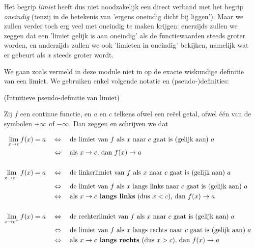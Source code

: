 \documentclass[numbers,wordchoicegiven]{ximera}
\begin{document}
Het begrip \textit{limiet} heeft dus niet noodzakelijk een direct verband met het begrip \textit{oneindig} (tenzij in de betekenis van 'ergens oneindig dicht bij liggen'). Maar we zullen verder toch erg veel met oneindig te maken krijgen: enerzijds zullen we zeggen dat een 'limiet gelijk is aan oneindig' als de functiewaarden steeds groter worden, en anderzijds zullen we ook 'limieten in oneindig' bekijken, namelijk wat er gebeurt als $x$ steeds groter wordt.


We gaan zoals vermeld in deze module niet in op de exacte wiskundige definitie van een limiet. We gebruiken enkel volgende notatie en (pseudo-)definities:

\begin{definition} (Intuïtieve pseudo-definitie van limiet)
	
	Zij $f$ een continue functie, en $a$ en $c$ telkens ofwel een reëel getal, ofwel één van de symbolen $+\infty$ of $-\infty$. 
	Dan zeggen en schrijven we dat 

\begin{align*}
	\limxc  f(x) = a & \quad\iff\quad \text{de limiet van $f$ als $x$ naar $c$ gaat is (gelijk aan) $a$} \\
	                   & \quad\iff\quad \text{als }x\to c\text{, dan } 									f(x) \to a \\
	                   \\
	\llimxc f(x) = a & \quad\iff\quad \text{de linkerlimiet van $f$ als $x$ naar $c$ gaat is (gelijk aan) $a$} \\
	                   & \quad\iff\quad \text{de limiet van $f$ als $x$ langs links naar $c$ gaat is (gelijk aan) $a$} \\
	                   & \quad\iff\quad \text{als }x\to c\text{\textbf{ langs links} (dus $x<c$), dan } f(x) \to a \\
	                   \\
	\rlimxc f(x) = a & \quad\iff\quad \text{de rechterlimiet van $f$ als $x$ naar $c$ gaat is (gelijk aan) $a$} \\
					   & \quad\iff\quad \text{de limiet van $f$ als $x$ langs rechts naar $c$ gaat is (gelijk aan) $a$} \\
					   & \quad\iff\quad \text{als }x\to c\text{\textbf{ langs rechts} (dus $x>c$), dan }f(x) \to a 
\end{align*}

\end{definition}
\end{document}
